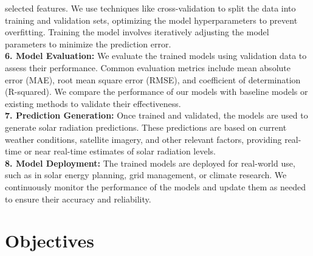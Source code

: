 \documentclass[12pt,a4paper]{report}
\begin{document}
selected features. We use techniques like cross-validation to split the data into training  
and validation sets, optimizing the model hyperparameters to prevent overfitting. 
Training the model involves iteratively adjusting the model parameters to minimize 
the prediction error. \\
\textbf{6. Model Evaluation:} We evaluate the trained models using validation data to assess 
their performance. Common evaluation metrics include mean absolute error (MAE), 
root mean square error (RMSE), and coefficient of determination (R-squared). We  
compare the performance of our models with baseline models or existing methods to 
validate their effectiveness. \\
\textbf{7. Prediction Generation:} Once trained and validated, the models are used to 
generate solar radiation predictions. These predictions are based on current weather 
conditions, satellite imagery, and other relevant factors, providing real-time or near
real-time estimates of solar radiation levels. \\
\textbf{8. Model Deployment:} The trained models are deployed for real-world use, such as in 
solar energy planning, grid management, or climate research. We continuously 
monitor the performance of the models and update them as needed to ensure their 
accuracy and reliability.
\section{Objectives}
\end{document}
